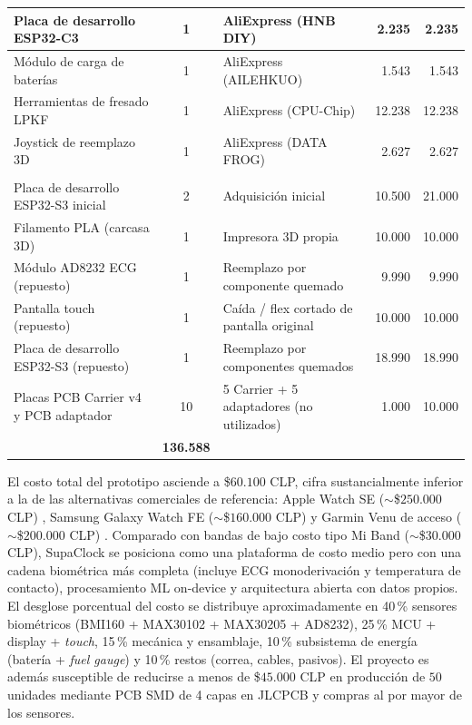 \documentclass[letterpaper,11pt]{article}
\begin{document}
\begin{table}[H]
\begin{tabular}{|L{4.3cm}|c|L{3.4cm}|r|r|}
    Placa de desarrollo ESP32-C3 & 1 & AliExpress (HNB DIY) & 2.235 & 2.235 \\\hline
    M\'odulo de carga de bater\'ias & 1 & AliExpress (AILEHKUO) & 1.543 & 1.543 \\\hline
    Herramientas de fresado LPKF & 1 & AliExpress (CPU-Chip) & 12.238 & 12.238 \\\hline
    Joystick de reemplazo 3D & 1 & AliExpress (DATA FROG) & 2.627 & 2.627 \\\hline
     \\\hline
    Placa de desarrollo ESP32-S3 inicial & 2 & Adquisici\'on inicial & 10.500 & 21.000 \\\hline
    Filamento PLA (carcasa 3D) & 1 & Impresora 3D propia & 10.000 & 10.000 \\\hline
    M\'odulo AD8232 ECG (repuesto) & 1 & Reemplazo por componente quemado & 9.990 & 9.990 \\\hline
    Pantalla touch (repuesto) & 1 & Ca\'ida / flex cortado de pantalla original & 10.000 & 10.000 \\\hline
    Placa de desarrollo ESP32-S3 (repuesto) & 1 & Reemplazo por componentes quemados & 18.990 & 18.990 \\\hline
    Placas PCB Carrier v4 y PCB adaptador & 10 & 5 Carrier + 5 adaptadores (no utilizados) & 1.000 & 10.000 \\\hline
     & \textbf{136.588} \\\hline
    \end{tabular}
\end{table}

El costo total del prototipo asciende a \$$60.100$ CLP, cifra sustancialmente inferior  a la de las alternativas comerciales de referencia: Apple Watch SE ($\sim$\$$250.000$ CLP) \cite{apple_watch_compare}, Samsung Galaxy Watch FE ($\sim$\$$160.000$ CLP) \cite{galaxy_watch4} y Garmin Venu de acceso ($\sim$\$$200.000$ CLP) \cite{garmin_venu}. Comparado con bandas de bajo costo tipo Mi Band ($\sim$\$$30.000$ CLP), SupaClock se posiciona como una plataforma de costo medio pero con una cadena biom\'etrica m\'as completa (incluye ECG monoderivaci\'on y temperatura de contacto), procesamiento ML on-device y arquitectura abierta con datos propios. El desglose porcentual del costo se distribuye aproximadamente en 40\,\% sensores biom\'etricos (BMI160 + MAX30102 + MAX30205 + AD8232), 25\,\% MCU + display + \textit{touch}, 15\,\% mec\'anica y ensamblaje, 10\,\% subsistema de energ\'ia (bater\'ia + \textit{fuel gauge}) y 10\,\% restos (correa, cables, pasivos). El proyecto es adem\'as susceptible de reducirse a menos de \$$45.000$ CLP en producci\'on de $50$ unidades mediante PCB SMD de 4 capas en JLCPCB y compras al por mayor de los sensores.
\end{document}
